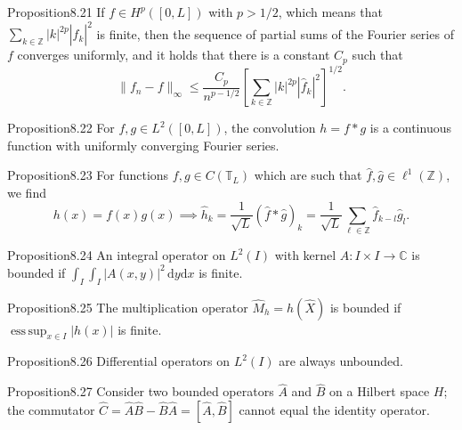 \begin{res}{Proposition}{8.21}
If $f\in H^p([0,L])$ with $p>1/2$, which means that $\sum_{k\in\mathbb Z}|k|^{2p}\left|\widehat f_k\right|^2$ is finite, then the sequence of partial sums of the Fourier series of $f$ converges uniformly, and it holds that there is a constant $C_p$ such that
\begin{equation}\|f_n-f\|_\infty\le\frac{C_p}{n^{p-1/2}}\left[\sum_{k\in\mathbb Z}|k|^{2p}\left|\widehat f_k\right|^2\right]^{1/2}.\tag{8.84}\end{equation}
\end{res}

\begin{res}{Proposition}{8.22}
For $f,g\in L^2([0,L])$, the convolution $h=f*g$ is a continuous function with uniformly converging Fourier series.
\end{res}

\begin{res}{Proposition}{8.23}
For functions $f,g\in C(\mathbb T_L)$ which are such that $\widehat f,\widehat g\in\ell^1(\mathbb Z)$, we find
\begin{equation}h(x)=f(x)g(x)\implies\widehat h_k=\frac1{\sqrt L}(\widehat f*\widehat g)_k=\frac1{\sqrt L}\sum_{\ell\in\mathbb Z}\widehat f_{k-l}\widehat g_l.\tag{8.86}\end{equation}
\end{res}

\begin{res}{Proposition}{8.24}
An integral operator on $L^2(I)$ with kernel $A:I\times I\to\mathbb C$ is bounded if $\int_I\int_I|A(x,y)|^2\,\mathrm dy\mathrm dx$ is finite.
\end{res}

\begin{res}{Proposition}{8.25}
The multiplication operator $\hat M_h=h(\hat X)$ is bounded if $\operatorname*{ess\,sup}_{x\in I}|h(x)|$ is finite.
\end{res}

\begin{res}{Proposition}{8.26}
Differential operators on $L^2(I)$ are always unbounded.
\end{res}

\begin{res}{Proposition}{8.27}
Consider two bounded operators $\hat A$ and $\hat B$ on a Hilbert space $H$; the commutator $\hat C=\hat A\hat B-\hat B\hat A=[\hat A,\hat B]$ cannot equal the identity operator.
\end{res}

